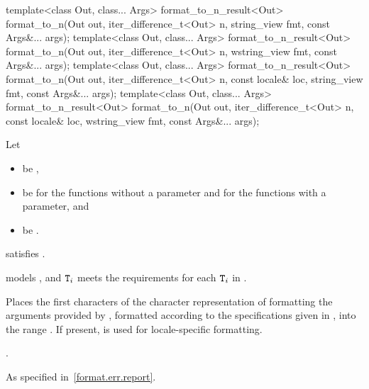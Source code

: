 %
\begin{itemdecl}
template<class Out, class... Args>
  format_to_n_result<Out> format_to_n(Out out, iter_difference_t<Out> n,
                                      string_view fmt, const Args&... args);
template<class Out, class... Args>
  format_to_n_result<Out> format_to_n(Out out, iter_difference_t<Out> n,
                                      wstring_view fmt, const Args&... args);
template<class Out, class... Args>
  format_to_n_result<Out> format_to_n(Out out, iter_difference_t<Out> n,
                                      const locale& loc, string_view fmt,
                                      const Args&... args);
template<class Out, class... Args>
  format_to_n_result<Out> format_to_n(Out out, iter_difference_t<Out> n,
                                      const locale& loc, wstring_view fmt,
                                      const Args&... args);
\end{itemdecl}

\begin{itemdescr}
\pnum
Let
\begin{itemize}
\item {} be ,
\item {} be
 for the functions without a  parameter and
 for the functions with a  parameter, and
\item {} be .
\end{itemize}

\pnum
\constraints
{} satisfies .

\pnum
\expects
{} models , and
$\texttt{T}_i$
meets the  requirements
for each $\texttt{T}_i$ in .

\pnum
\effects
Places the first  characters of the character representation of
formatting the arguments provided by ,
formatted according to the specifications given in ,
into the range .
If present,  is used for locale-specific formatting.

\pnum
\returns
{}.

\pnum
\throws
As specified in~\ref{format.err.report}.
\end{itemdescr}

